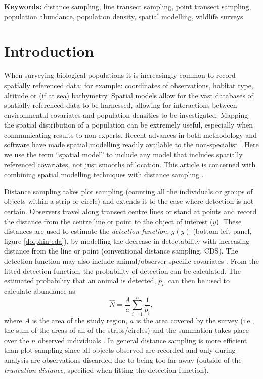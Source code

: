 \documentclass[a4paper,12pt]{article}
\begin{document}
\noindent \textbf{Keywords:} distance sampling, line transect sampling, point transect sampling, population abundance, population density, spatial modelling, wildlife surveys


\newpage

\section*{Introduction}
\label{s:intro}

When surveying biological populations it is increasingly common to record spatially referenced data; for example: coordinates of observations, habitat type, altitude or (if at sea) bathymetry. Spatial models allow for the vast databases of spatially-referenced data to be harnessed, allowing for interactions between environmental covariates and population densities to be investigated. Mapping the spatial distribution of a population can be extremely useful, especially when communicating results to non-experts. Recent advances in both methodology and software have made spatial modelling readily available to the non-specialist \citep[e.g.,][]{Wood:2006wz, Rue:2009tw}. Here we use the term ``spatial model'' to include any model that includes spatially referenced covariates, not just smooths of location. This article is concerned with combining spatial modelling techniques with distance sampling \citep{Buckland:2001vm, Buckland:2004ts}. 

Distance sampling takes plot sampling (counting all the individuals or groups of objects within a strip or circle) and extends it to the case where detection is not certain. Observers travel along transect centre lines or stand at points and record the distance from the centre line or point to the object of interest ($y$). These distances are used to estimate the \textit{detection function}, $g(y)$ (bottom left panel, figure \ref{dolphin-eda}), by modelling the decrease in detectability with increasing distance from the line or point (conventional distance sampling, CDS). The detection function may also include animal/observer specific covariates \citep[multiple covariate distance sampling, MCDS;][]{Marques:2007vm}. From the fitted detection function, the probability of detection can be calculated. The estimated probability that an animal is detected, $\hat{p}_i$, can then be used to calculate abundance as
\begin{equation}
\hat{N} = \frac{A}{a} \sum_{i=1}^{n} \frac{1}{\hat{p}_i},
\label{ht-est}
\end{equation}
where $A$ is the area of the study region, $a$ is the area covered by the survey (i.e., the sum of the areas of all of the strips/circles) and the summation takes place over the $n$ observed individuals \citep[Chapter 3]{Buckland:2001vm}. In general distance sampling is more efficient than plot sampling since all objects observed are recorded and only during analysis are observations discarded due to being too far away (outside of the \textit{truncation distance}, specified when fitting the detection function).
\end{document}
